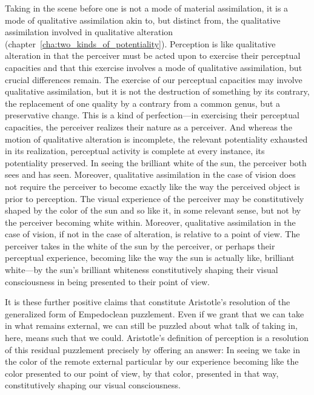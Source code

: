 Taking in the scene before one is not a mode of material assimilation, it is a mode of qualitative assimilation akin to, but distinct from, the qualitative assimilation involved in qualitative alteration (chapter~\ref{cha:two_kinds_of_potentiality}). Perception is like qualitative alteration in that the perceiver must be acted upon to exercise their perceptual capacities and that this exercise involves a mode of qualitative assimilation, but crucial differences remain. The exercise of our perceptual capacities may involve qualitative assimilation, but it is not the destruction of something by its contrary, the replacement of one quality by a contrary from a common genus, but a preservative change. This is a kind of perfection---in exercising their perceptual capacities, the perceiver realizes their nature as a perceiver. And whereas the motion of qualitative alteration is incomplete, the relevant potentiality exhausted in its realization, perceptual activity is complete at every instance, its potentiality preserved. In seeing the brilliant white of the sun, the perceiver both sees and has seen. Moreover, qualitative assimilation in the case of vision does not require the perceiver to become exactly like the way the perceived object is prior to perception. The visual experience of the perceiver may be constitutively shaped by the color of the sun and so like it, in some relevant sense, but not by the perceiver becoming white within. Moreover, qualitative assimilation in the case of vision, if not in the case of alteration, is relative to a point of view. The perceiver takes in the white of the sun by the perceiver, or perhaps their perceptual experience, becoming like the way the sun is actually like, brilliant white---by the sun's brilliant whiteness constitutively shaping their visual consciousness in being presented to their point of view.

It is these further positive claims that constitute Aristotle's resolution of the generalized form of Empedoclean puzzlement. Even if we grant that we can take in what remains external, we can still be puzzled about what talk of taking in, here, means such that we could. Aristotle's definition of perception is a resolution of this residual puzzlement precisely by offering an answer: In seeing we take in the color of the remote external particular by our experience becoming like the color presented to our point of view, by that color, presented in that way, constitutively shaping our visual consciousness.

